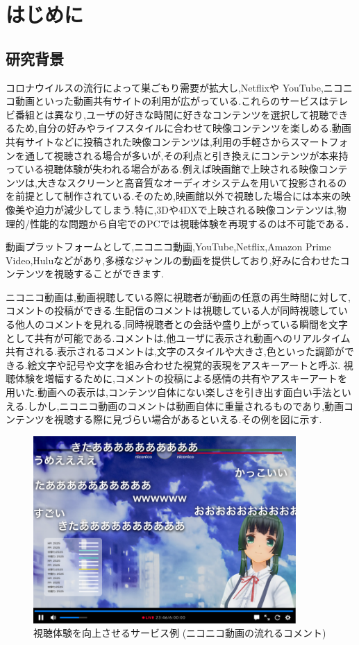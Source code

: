 \chapter{はじめに}
\thispagestyle{myheadings}

\section{研究背景}
コロナウイルスの流行によって巣ごもり需要が拡大し,Netflixや YouTube,ニコニコ動画といった動画共有サイトの利用が広がっている.これらのサービスはテレビ番組とは異なり,ユーザの好きな時間に好きなコンテンツを選択して視聴できるため,自分の好みやライフスタイルに合わせて映像コンテンツを楽しめる.動画共有サイトなどに投稿された映像コンテンツは,利用の手軽さからスマートフォンを通して視聴される場合が多いが,その利点と引き換えにコンテンツが本来持っている視聴体験が失われる場合がある.例えば映画館で上映される映像コンテンツは,大きなスクリーンと高音質なオーディオシステムを用いて投影されるのを前提として制作されている.そのため,映画館以外で視聴した場合には本来の映像美や迫力が減少してしまう.特に,3Dや4DXで上映される映像コンテンツは,物理的/性能的な問題から自宅でのPCでは視聴体験を再現するのは不可能である．

動画プラットフォームとして,ニコニコ動画,YouTube,Netflix,Amazon Prime Video,Huluなどがあり,多様なジャンルの動画を提供しており,好みに合わせたコンテンツを視聴することができます.

ニコニコ動画は,動画視聴している際に視聴者が動画の任意の再生時間に対して,コメントの投稿ができる.生配信のコメントは視聴している人が同時視聴している他人のコメントを見れる,同時視聴者との会話や盛り上がっている瞬間を文字として共有が可能である.コメントは,他ユーザに表示され動画へのリアルタイム共有される.表示されるコメントは,文字のスタイルや大きさ,色といった調節ができる.絵文字や記号や文字を組み合わせた視覚的表現をアスキーアートと呼ぶ.
視聴体験を増幅するために,コメントの投稿による感情の共有やアスキーアートを用いた.動画への表示は,コンテンツ自体にない楽しさを引き出す面白い手法といえる.しかし,ニコニコ動画のコメントは動画自体に重量されるものであり,動画コンテンツを視聴する際に見づらい場合があるといえる.その例を図に示す.
\begin{figure}[H]
    \centering
    \includegraphics[width=10cm]{images/chapter1/nikoniko_grafu.png}
    \caption{視聴体験を向上させるサービス例 (ニコニコ動画の流れるコメント)}
\end{figure}

